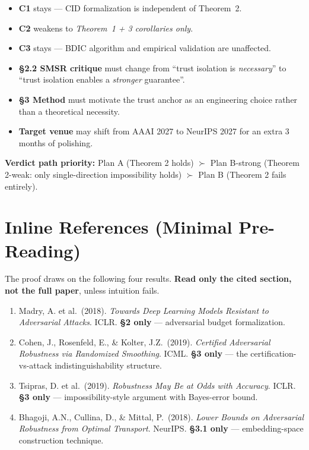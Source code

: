 \documentclass[11pt]{article}
\theoremstyle{plain}
\theoremstyle{definition}
\begin{document}
\begin{itemize}[noitemsep]
  \item \textbf{C1} stays --- CID formalization is independent of Theorem~2.
  \item \textbf{C2} weakens to \emph{Theorem~1 + 3 corollaries only}.
  \item \textbf{C3} stays --- BDIC algorithm and empirical validation are unaffected.
  \item \textbf{\S 2.2 SMSR critique} must change from
        ``trust isolation is \emph{necessary}'' to
        ``trust isolation enables a \emph{stronger} guarantee''.
  \item \textbf{\S 3 Method} must motivate the trust anchor as an
        engineering choice rather than a theoretical necessity.
  \item \textbf{Target venue} may shift from AAAI 2027 to NeurIPS 2027
        for an extra 3 months of polishing.
\end{itemize}

\textbf{Verdict path priority:} Plan A (Theorem 2 holds) $\succ$
Plan B-strong (Theorem 2-weak: only single-direction impossibility holds) $\succ$
Plan B (Theorem 2 fails entirely).

\section{Inline References (Minimal Pre-Reading)}

The proof draws on the following four results. \textbf{Read only the cited section,
not the full paper}, unless intuition fails.

\begin{enumerate}[noitemsep]
  \item Madry, A. et al.\ (2018). \emph{Towards Deep Learning Models Resistant to
        Adversarial Attacks}. ICLR. \textbf{\S 2 only} --- adversarial budget formalization.
  \item Cohen, J., Rosenfeld, E., \& Kolter, J.Z.\ (2019). \emph{Certified Adversarial
        Robustness via Randomized Smoothing}. ICML. \textbf{\S 3 only} ---
        the certification-vs-attack indistinguishability structure.
  \item Tsipras, D. et al.\ (2019). \emph{Robustness May Be at Odds with Accuracy}.
        ICLR. \textbf{\S 3 only} --- impossibility-style argument with Bayes-error bound.
  \item Bhagoji, A.N., Cullina, D., \& Mittal, P.\ (2018). \emph{Lower Bounds on Adversarial
        Robustness from Optimal Transport}. NeurIPS. \textbf{\S 3.1 only} ---
        embedding-space construction technique.
\end{enumerate}
\end{document}
